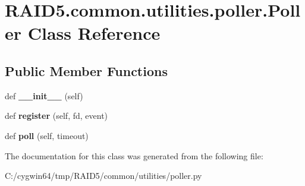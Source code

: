\hypertarget{class_r_a_i_d5_1_1common_1_1utilities_1_1poller_1_1_poller}{}\section{R\+A\+I\+D5.\+common.\+utilities.\+poller.\+Poller Class Reference}
\label{class_r_a_i_d5_1_1common_1_1utilities_1_1poller_1_1_poller}
\subsection*{Public Member Functions}
\begin{DoxyCompactItemize}
\item 
\mbox{\label{class_r_a_i_d5_1_1common_1_1utilities_1_1poller_1_1_poller_af5d855a67c680b7d8a11c508d9238746}} 
def {\bfseries \+\_\+\+\_\+init\+\_\+\+\_\+} (self)
\item 
\mbox{\label{class_r_a_i_d5_1_1common_1_1utilities_1_1poller_1_1_poller_ab2f49582a72257205602f142d87a4b02}} 
def {\bfseries register} (self, fd, event)
\item 
\mbox{\label{class_r_a_i_d5_1_1common_1_1utilities_1_1poller_1_1_poller_af85695b10f249fe19709c4aa62a9ac03}} 
def {\bfseries poll} (self, timeout)
\end{DoxyCompactItemize}


The documentation for this class was generated from the following file\+:\begin{DoxyCompactItemize}
\item 
C\+:/cygwin64/tmp/\+R\+A\+I\+D5/common/utilities/poller.\+py\end{DoxyCompactItemize}
